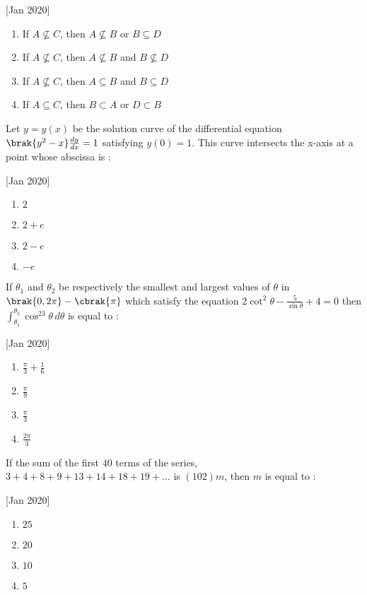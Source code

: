     \hfill[Jan 2020]
        \begin{enumerate}
            \item If $A \nsubseteq C$, then $A \nsubseteq B$ or $B \subseteq D$
            \item If $A \nsubseteq C$, then $A \nsubseteq B$ and $B \nsubseteq D$
            \item If $A \nsubseteq C$, then $A \subseteq B$ and $B \subseteq D$
            \item If $A \subseteq C$, then $B \subset A$ or $D \subset B$
        \end{enumerate}

    \item Let $y=y(x)$ be the solution curve of the differential equation $\brak{y^2-x}\frac{dy}{dx}=1$ satisfying $y(0)=1$. This curve intersects the x-axis at a point whose abscissa is :
    
    \hfill[Jan 2020]
        \begin{enumerate}
            \item $2$
            \item $2+e$
            \item $2-e$
            \item $-e$
        \end{enumerate}

    \item If $\theta_1$ and $\theta_2$ be respectively the smallest and largest values of $\theta$ in $\brak{0,2\pi}-\cbrak{\pi}$ which satisfy the equation $2\cot^2\theta-\frac{5}{\sin\theta}+4=0$ then $\int_{\theta_1}^{\theta_2}\cos^23\theta\,d\theta$ is equal to :
    
    \hfill[Jan 2020]
        \begin{enumerate}
            \item $\frac{\pi}{3}+\frac{1}{6}$
            \item $\frac{\pi}{9}$
            \item $\frac{\pi}{3}$
            \item $\frac{2\pi}{3}$
        \end{enumerate}

    \item If the sum of the first $40$ terms of the series, $3+4+8+9+13+14+18+19+\dots$ is $(102)m$, then $m$ is equal to :
    
    \hfill[Jan 2020]
        \begin{enumerate}
            \item $25$
            \item $20$
            \item $10$
            \item $5$
        \end{enumerate}

